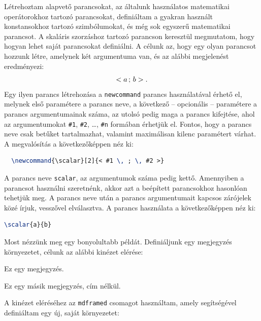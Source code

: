 Létrehoztam alapvető parancsokat, az általunk használatos matematikai
operátorokhoz tartozó parancsokat, definiáltam a gyakran használt konstansokhoz
tartozó szimbólumokat, és még sok egyszerű matematikai parancsot.
A skaláris szorzáshoz tartozó parancson keresztül megmutatom, hogy hogyan
lehet saját parancsokat definiálni. A célunk az, hogy egy olyan parancsot
hozzunk létre, amelynek két argumentuma van, és az alábbi megjelenést
eredményezi:
\[
	< a \, ; \, b >
	\text.
\]
Egy ilyen parancs létrehozása a \texttt{newcommand} parancs használatával
érhető el, melynek első paramétere a parancs neve, a következő -- opcionális --
paramétere a parancs argumentumainak száma, az utolsó pedig maga a parancs
kifejtése, ahol az argumentumokat \texttt{\#1}, \texttt{\#2}, \ldots,
\texttt{\#n} formában érhetjük el. Fontos, hogy a parancs neve csak betűket
tartalmazhat, valamint maximálisan kilenc paramétert várhat. A megvalósítás
a következőképpen néz ki:

\begin{lstlisting}[language=tex,caption={Skaláris szorzás parancs definíciója}]
  % \newcommand{<parancs neve>}[<argumentumok száma>]{<parancs definíciója>}
  \newcommand{\scalar}[2]{< #1 \, ; \, #2 >}
\end{lstlisting}

A parancs neve \texttt{scalar}, az argumentumok száma pedig kettő. Amennyiben
a parancsot használni szeretnénk, akkor azt a beépített parancsokhoz hasonlóan
tehetjük meg. A parancs neve után a parancs argumentumait kapcsos zárójelek
közé írjuk, vesszővel elválasztva. A parancs használata a következőképpen
néz ki:

\begin{lstlisting}[language=tex,caption={Skaláris szorzás parancs használata}]
  \scalar{a}{b}
\end{lstlisting}

Most nézzünk meg egy bonyolultabb példát. Definiáljunk egy megjegyzés
környezetet, célunk az alábbi kinézet elérése:

\begin{note}
	\noindent Ez egy megjegyzés.
\end{note}
\begin{note}
	\noindent Ez egy másik megjegyzés, cím nélkül.
\end{note}

A kinézet eléréséhez az \texttt{mdframed} csomagot használtam, amely
segítségével definiáltam egy új, saját környezetet:

